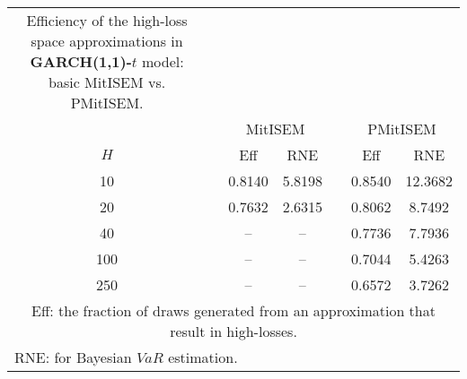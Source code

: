 { \renewcommand{\arraystretch}{1.2} 
\begin{longtable}{cc cc c cc} 
\caption{Efficiency of the high-loss space approximations in \textbf{GARCH(1,1)-$t$} model:\\ basic MitISEM vs. PMitISEM.} 
\label{tab:efft_garch2_noS} \\ 
 && \multicolumn{2}{c}{MitISEM} && \multicolumn{2}{c}{PMitISEM} \\ \cline{3-4} \cline{6-7} 
 $H$ && Eff  & RNE && Eff & RNE  \\ \cline{1-1} \cline{3-4} \cline{6-7} 
10 & &0.8140 &  5.8198 && 0.8540 &  12.3682 \\ [1ex] 
20 & &0.7632 &  2.6315 && 0.8062 &  8.7492 \\ [1ex] 
40 & &-- & -- && 0.7736 &  7.7936 \\ [1ex] 
100 & &-- & -- && 0.7044 &  5.4263 \\ [1ex] 
250 & &-- & -- && 0.6572 &  3.7262 \\ [1ex] 
\hline 
\multicolumn{7}{p{7cm}}{\footnotesize{Eff: the fraction of draws generated from an approximation that result in high-losses.}}  \\ 
\multicolumn{7}{l}{\footnotesize{RNE: for Bayesian $VaR$ estimation.}} 
\end{longtable} 
} 
